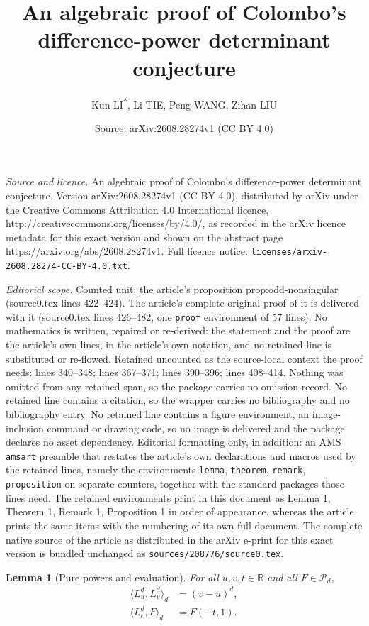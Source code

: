 \documentclass[10pt,a4paper]{amsart}
\title{An algebraic proof of Colombo's difference-power determinant conjecture}
\author{Kun LI\textsuperscript{*}, Li TIE, Peng WANG, Zihan LIU}
\date{Source: arXiv:2608.28274v1 (CC BY 4.0)}
\newtheorem{lemma}{Lemma}
\newcommand{\RR}{\mathbb{R}}
\newcommand{\cP}{\mathcal{P}}
\begin{document}
\maketitle

\noindent\emph{Source and licence.} An algebraic proof of Colombo's difference-power determinant conjecture. Version arXiv:2608.28274v1 (CC BY 4.0), distributed by arXiv under the Creative Commons Attribution 4.0 International licence, http://creativecommons.org/licenses/by/4.0/, as recorded in the arXiv licence metadata for this exact version and shown on the abstract page https://arxiv.org/abs/2608.28274v1. Full licence notice: \texttt{licenses/arxiv-2608.28274-CC-BY-4.0.txt}.\par\smallskip

\noindent\textit{Editorial scope.} Counted unit: the article's proposition prop:odd-nonsingular (source0.tex lines 422--424). The article's complete original proof of it is delivered with it (source0.tex lines 426--482, one \texttt{proof} environment of 57 lines). No mathematics is written, repaired or re-derived: the statement and the proof are the article's own lines, in the article's own notation, and no retained line is substituted or re-flowed.  Retained uncounted as the source-local context the proof needs: lines 340--348; lines 367--371; lines 390--396; lines 408--414.  Nothing was omitted from any retained span, so the package carries no omission record.  No retained line contains a citation, so the wrapper carries no bibliography and no bibliography entry.  No retained line contains a figure environment, an image-inclusion command or drawing code, so no image is delivered and the package declares no asset dependency.  Editorial formatting only, in addition: an AMS \texttt{amsart} preamble that restates the article's own declarations and macros used by the retained lines, namely the environments \texttt{lemma}, \texttt{theorem}, \texttt{remark}, \texttt{proposition} on separate counters, together with the standard packages those lines need.  The retained environments print in this document as Lemma 1, Theorem 1, Remark 1, Proposition 1 in order of appearance, whereas the article prints the same items with the numbering of its own full document.  The complete native source of the article as distributed in the arXiv e-print for this exact version is bundled unchanged as \texttt{sources/208776/source0.tex}.
\begin{lemma}[Pure powers and evaluation]\label{lem:apolar-identities}
For all \(u,v,t\in\RR\) and all \(F\in\cP_d\),
\begin{align}
 \langle L_u^d,L_v^d\rangle_d
 &= (v-u)^d, \label{eq:pure-power-pairing}\\
 \langle L_t^d,F\rangle_d
 &= F(-t,1). \label{eq:evaluation}
\end{align}
\end{lemma}
\end{document}
